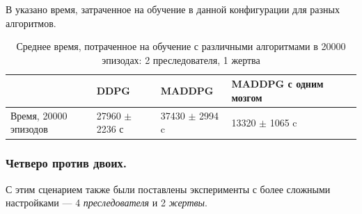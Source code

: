 В  указано время, затраченное на обучение в данной конфигурации для разных алгоритмов.

\begin{table}[t!]
    \centering\small
    \caption{Среднее время, потраченное на обучение с различными алгоритмами в 20000 эпизодах: 2 преследователя, 1 жертва}
    \label{tab-st-time}
    \begin{tabular}{|l|l|l|l|l|l|}
        \hline
        & DDPG       & MADDPG      & MADDPG с одним мозгом \\
        \hline
        Время, 20000 эпизодов & 27960 $\pm$ 2236 с & 37430 $\pm$ 2994 c & 13320 $\pm$ 1065 c \\ \hline
    \end{tabular}
    \normalsize%
\end{table}

\subsubsection{Четверо против двоих.}

С этим сценарием также были поставлены эксперименты с более сложными настройками --- 4 \textit{преследователя} и 2 \textit{жертвы}.

